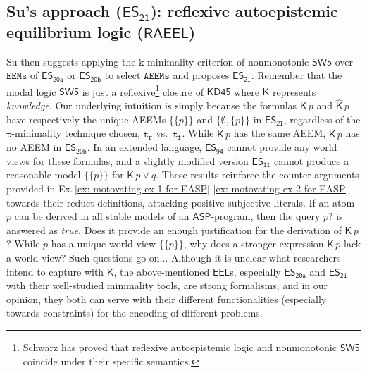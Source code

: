 \documentclass[submission,copyright,creativecommons]{eptcs}
\newcommand{\set}[1]  { \{ #1 \} }
\newcommand{\logic}[1]  { \ensuremath{\mathsf{#1}} }
\newcommand{\KD}  { \logic{KD45} }
\newcommand{\SW}  { \logic{SW5} }
\newcommand{\ASP}  { \logic{ASP} }
\newcommand{\EEL}  { \logic{EEL} }
\newcommand{\RAEEL}  { \logic{RAEEL} }
\newcommand{\K}  { \mathsf{K} }
\newcommand{\Khat}  { \hat{\mathsf{K}} }
\newcommand{\ESdoksandort}  { \logic{ES_{\scriptscriptstyle{94}} } }
\newcommand{\ESonbir}  { \logic{ES_{\scriptscriptstyle{11}} } }
\newcommand{\ESyirmia}  { \logic{ES_{\scriptscriptstyle{20a}} } }
\newcommand{\ESyirmib}  { \logic{ES_{\scriptscriptstyle{20b}} } }
\newcommand{\ESyirmibir}  { \logic{ES_{\scriptscriptstyle{21}} } }
\newcommand{\functional}  { \texttt{f} }
\newcommand{\relational}  { \texttt{r} }
\newcommand{\tfunctional}  { \texttt{t}_{\!\functional} }
\newcommand{\trelational}  { \texttt{t}_{\!\relational} }
\newcommand{\EEMs}  { \texttt{EEMs} }
\newcommand{\AEEMs}  { \texttt{AEEMs} }
\begin{document}
\subsection{Su's approach {\normalfont (\texorpdfstring{$\ESyirmibir$}{ESyirmibir}):} 
reflexive autoepistemic equilibrium logic \normalfont (\texorpdfstring{$\RAEEL$}{RAEEL})}
\label{subsec:EEL.Su}
Su \cite{Su2021} then suggests applying the $\texttt{k}$-minimality
criterion of nonmonotonic $\SW$ \cite{Su17.reflexive} over $\EEMs$ of $\ESyirmia$ or $\ESyirmib$ to select $\AEEMs$ and proposes $\ESyirmibir$. Remember that the modal logic $\SW$ is just a reflexive\footnote{Schwarz \cite{Schwarz92} has proved that reflexive 
autoepistemic logic and nonmonotonic $\SW$ coincide under their specific semantics.} closure of 
$\KD$ where $\K$ represents \emph{knowledge}. 
Our underlying intuition is simply because  
the formulas $\K\,p$ and $\Khat\,p$ have respectively the unique AEEMs 
$\set{\set p}$ and $\set{\emptyset, \set p}$ in $\ESyirmibir$, regardless of the 
$\texttt{t}$-minimality technique chosen, $\trelational$ vs.\ $\tfunctional$. 
While $\Khat\,p$ has the same AEEM, $\K\,p$ has no AEEM
in $\ESyirmib$. In an extended language, $\ESdoksandort$ cannot provide any 
world views for these formulas, and a slightly modified version
$\ESonbir$ \cite{gelfond2011new} cannot produce
a reasonable model $\set{\set p}$ for $\K\,p \lor q$. These results reinforce the counter-arguments 
provided in Ex.\,\ref{ex: motovating ex 1 for EASP}-\ref{ex: motovating ex 2 for EASP}  
towards their reduct definitions, attacking positive subjective literals. If an atom $p$ can be derived in all
stable models of an $\ASP$-program, then the query $p?$ is answered as \emph{true}. 
Does it provide an enough justification for the derivation of $\K\,p$? 
While $p$ has a unique world view $\set{\set p}$, 
why does a stronger expression $\K\,p$ lack a world-view? Such questions go on...
Although it is unclear what researchers intend to capture with $\K$, 
the above-mentioned
$\EEL$s, especially $\ESyirmia$ and $\ESyirmibir$ with their well-studied minimality tools, 
are strong formalisms, and 
in our opinion, they both can serve
with their different functionalities (especially towards constraints) for the encoding of different problems.
\end{document}
